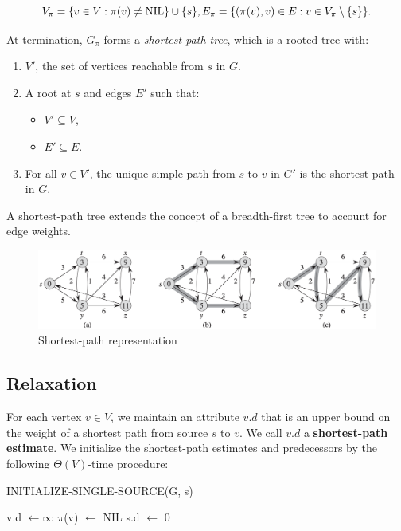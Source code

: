 $$
V_\pi = \{v \in V : \pi(v) \neq \text{NIL}\} \cup \{s\},
\\
E_\pi = \{(\pi(v), v) \in E : v \in V_\pi \setminus \{s\}\}.
$$

At termination, $G_\pi$ forms a \textit{shortest-path tree}, which is a rooted tree with:

\begin{enumerate}
    \item $V'$, the set of vertices reachable from $s$ in $G$.
    \item A root at $s$ and edges $E'$ such that:
    \begin{itemize}
        \item $V' \subseteq V$,
        \item $E' \subseteq E$.
    \end{itemize}
    \item For all $v \in V'$, the unique simple path from $s$ to $v$ in $G'$ is the shortest path in $G$.
\end{enumerate}

A shortest-path tree extends the concept of a breadth-first tree to account for edge weights.

\begin{figure}[H]
    \centering
    \includegraphics[width=\textwidth]{assets/representation_shortest_path.png}
    \caption{Shortest-path representation}
    \label{fig:representation_shortest_path}
\end{figure}

\subsection*{Relaxation}

For each vertex $v \in V$, we maintain an attribute $v.d$ that is an upper bound on the weight of a shortest path from source $s$ to $v$. We call $v.d$ a \textbf{shortest-path estimate}. We initialize the shortest-path estimates and predecessors by the following $\Theta(V)$-time procedure:

\begin{algorithm}[H]
    \caption{INITIALIZE-SINGLE-SOURCE(G, s)}
    \begin{algorithmic}[1]
            \State v.d $\gets \infty$
            \State $\pi$(v) $\gets$ NIL
        \EndFor
        \State s.d $\gets$ 0
    \end{algorithmic}
\end{algorithm}

